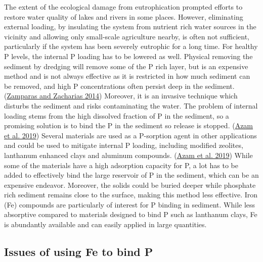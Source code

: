 \documentclass[a4paper,11pt]{article}
\begin{document}
The extent of the ecological damage from eutrophication prompted efforts to restore water quality of lakes and rivers in some places. However, eliminating external loading, by insulating the system from nutrient rich water sources in the vicinity and allowing only small-scale agriculture nearby, is often not sufficient, particularly if the system has been severely eutrophic for a long time. For healthy P levels, the internal P loading has to be lowered as well. Physical removing the sediment by dredging will remove some of the P rich layer, but is an expensive method and is not always effective as it is restricted in how much sediment can be removed, and high P concentrations often persist deep in the sediment. (\protect\hyperlink{ref-zamparasRestorationEutrophicFreshwater2014}{Zamparas and Zacharias 2014}) Moreover, it is an invasive technique which disturbs the sediment and risks contaminating the water. The problem of internal loading stems from the high dissolved fraction of P in the sediment, so a promising solution is to bind the P in the sediment so release is stopped. (\protect\hyperlink{ref-azamPhosphorousEnvironmentCharacteristics2019}{Azam et al. 2019}) Several materials are used as a P-sorption agent in other applications and could be used to mitigate internal P loading, including modified zeolites, lanthanum enhanced clays and aluminum compounds. (\protect\hyperlink{ref-azamPhosphorousEnvironmentCharacteristics2019}{Azam et al. 2019}) While some of the materials have a high adsorption capacity for P, a lot has to be added to effectively bind the large reservoir of P in the sediment, which can be an expensive endeavor. Moreover, the solids could be buried deeper while phosphate rich sediment remains close to the surface, making this method less effective. Iron (Fe) compounds are particularly of interest for P binding in sediment. While less absorptive compared to materials designed to bind P such as lanthanum clays, Fe is abundantly available and can easily applied in large quantities.

\hypertarget{issues-of-using-fe-to-bind-p}{%
\subsection{Issues of using Fe to bind P}\label{issues-of-using-fe-to-bind-p}}
\end{document}
